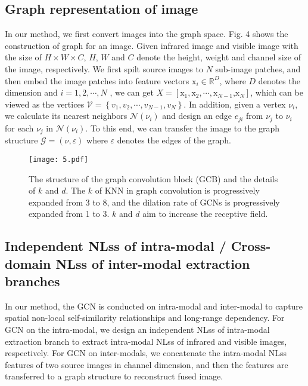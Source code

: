 \documentclass[journal]{IEEEtran}
\begin{document}
\subsection{Graph representation of image}
In our method, we first convert images into the graph space. Fig. 4 shows the construction of graph for an image. Given infrared image and visible image with the size of $H\times W\times C$, $H$, $W$ and $C$ denote the height, weight and channel size of the image, respectively. We first spilt source images to $N$ sub-image patches, and then embed the image patches into feature vectors ${{\text{x}}_{i}}\in {{\mathbb{R}}^{D}}$, where $D$ denotes the dimension and $i=1,2,\cdots ,N$ , we can get $X=\left[ {{\text{x}}_{1}},{{\text{x}}_{2}},\cdots ,{{\text{x}}_{N-1}}\text{,}{{\text{x}}_{N}} \right]$, which can be viewed as the vertices $\mathcal{V}=\left\{ {{v}_{1}},{{v}_{2}},\cdots ,{{v}_{N-1}},{{v}_{N}} \right\}$. In addition, given a vertex ${{\nu }_{i}}$, we calculate its nearest neighbors $\mathcal{N}\left( {{\nu }_{i}} \right)$ and design an edge ${{e}_{ji}}$ from ${{\nu }_{j}}$ to ${{\nu }_{i}}$ for each ${{\nu }_{j}}$ in $\mathcal{N}\left( {{\nu }_{i}} \right)$. To this end, we can transfer the image to the graph structure $\mathcal{G}=\left( \nu ,\varepsilon  \right)$ where $\varepsilon$ denotes the edges of the graph.

\begin{figure}[!t]
\centering
\texttt{[image: 5.pdf]}
\caption{The structure of the graph convolution block (GCB) and the details of $k$ and $d$. The $k$ of KNN in graph convolution is progressively expanded from 3 to 8, and the dilation rate of GCNs is progressively expanded from 1 to 3. $k$ and $d$ aim to increase the receptive field.}
\label{FIG:5}
\end{figure}

\subsection{Independent NLss of intra-modal / Cross-domain NLss of inter-modal extraction branches}
In our method, the GCN is conducted on intra-modal and inter-modal to capture spatial non-local self-similarity relationships and long-range dependency. For GCN on the intra-modal, we design an independent NLss of intra-modal extraction branch to extract intra-modal NLss of infrared and visible images, respectively. For GCN on inter-modals, we concatenate the intra-modal NLss features of two source images in channel dimension, and then the features are transferred to a graph structure to reconstruct fused image.
\end{document}
